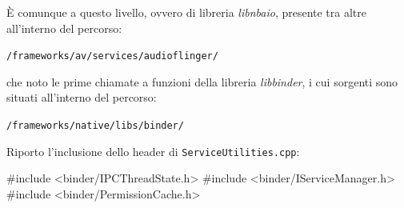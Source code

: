 È comunque a questo livello, ovvero di libreria \textit{libnbaio}, presente tra altre
all'interno del percorso:
\begin{center}
\texttt{\small \AOSP/frameworks/av/services/audioflinger/}
\end{center}
che noto le prime
chiamate a funzioni della libreria \textit{libbinder}, i cui sorgenti sono situati
all'interno del percorso:
\begin{center}
\texttt{\small \AOSP/frameworks/native/libs/binder/}
\end{center}
Riporto l'inclusione dello header di \texttt{\small ServiceUtilities.cpp}:
\begin{cpp}
#include <binder/IPCThreadState.h>
#include <binder/IServiceManager.h>
#include <binder/PermissionCache.h>
\end{cpp}
\begin{figure}[thp]
\centering
{}\\

\end{figure}
